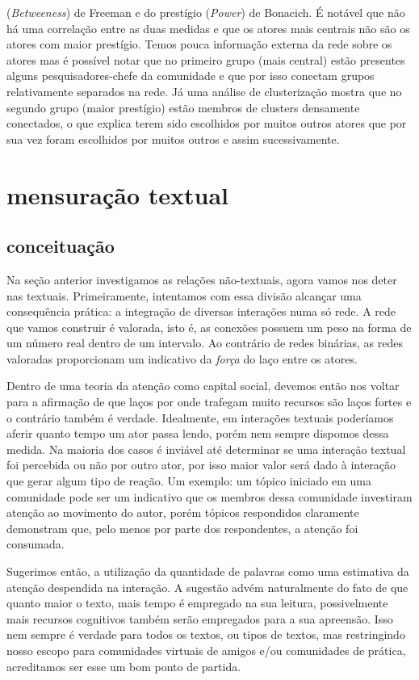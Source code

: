 \documentclass{article}
\begin{document}
\begin{table}[htbp]
\begin{boxedminipage}{\textwidth}
(\textit{Betweeness}) de Freeman e do prestígio (\textit{Power}) de Bonacich.
É notável que não há uma correlação entre as duas medidas e que os atores mais
centrais não são os atores com maior prestígio. Temos pouca informação externa
da rede sobre os atores mas é possível notar que no primeiro grupo (mais
central) estão presentes alguns pesquisadores-chefe da comunidade e que por isso
conectam grupos relativamente separados na rede. Já uma análise de clusterização
mostra que no segundo grupo (maior prestígio) estão membros de clusters
densamente conectados, o que explica terem sido escolhidos por muitos outros
atores que por sua vez foram escolhidos por muitos outros e assim
sucessivamente.

	\end{boxedminipage}
\end{table}
\clearpage

\section{mensuração textual}
\subsection{conceituação}
Na seção anterior investigamos as relações não-textuais, agora vamos nos deter
nas textuais. Primeiramente, intentamos com essa divisão alcançar uma
consequência prática: a integração de diversas interações numa só rede. A rede
que vamos construir é valorada, isto é, as conexões possuem um peso na forma de
um número real dentro de um intervalo. Ao contrário de redes binárias, as redes
valoradas proporcionam um indicativo da \textit{força} do laço entre os atores.

Dentro de uma teoria da atenção como capital social, devemos então nos voltar
para a afirmação de que laços por onde trafegam muito recursos são laços fortes
e o contrário também é verdade. Idealmente, em interações textuais poderíamos
aferir quanto tempo um ator passa lendo, porém nem sempre dispomos dessa medida.
Na maioria dos casos é inviável até determinar se uma interação textual foi
percebida ou não por outro ator, por isso maior valor será dado à interação que
gerar algum tipo de reação. Um exemplo: um tópico iniciado em uma comunidade
pode ser um indicativo que os membros dessa comunidade investiram atenção ao
movimento do autor, porém tópicos respondidos claramente demonstram que, pelo
menos por parte dos respondentes, a atenção foi consumada.

Sugerimos então, a utilização da quantidade de palavras como uma estimativa da
atenção despendida na interação. A sugestão advém naturalmente do fato de que
quanto maior o texto, mais tempo é empregado na sua leitura, possivelmente mais
recursos cognitivos também serão empregados para a sua apreensão. Isso nem
sempre é verdade para todos os textos, ou tipos de textos, mas restringindo
nosso escopo para comunidades virtuais de amigos e/ou comunidades de prática,
acreditamos ser esse um bom ponto de partida.
\end{document}
